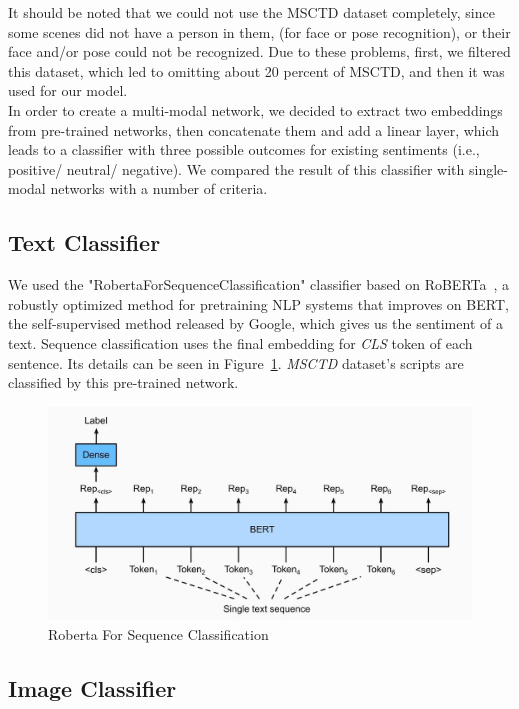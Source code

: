 It should be noted that we could not use the MSCTD dataset completely, since some scenes did not have a person in them, (for face or pose recognition), or their face and/or pose could not be recognized. Due to these problems, first, we filtered this dataset, which led to omitting about 20 percent of MSCTD, and then it was used for our model.
\\
In order to create a multi-modal network, we decided to extract two embeddings from pre-trained networks, then concatenate them and add a linear layer, which leads to a classifier with three possible outcomes for existing sentiments  (i.e., positive/ neutral/ negative). We compared the result of this classifier with single-modal networks with a number of criteria. 

\subsection{Text Classifier}
We used the "RobertaForSequenceClassification" classifier based on RoBERTa~\cite{liu2019roberta}, a robustly optimized method for pretraining NLP systems that improves on BERT, the self-supervised method released by Google, which gives us the sentiment of a text. Sequence classification uses the final embedding for \textit{CLS} token of each sentence. Its details can be seen in Figure~\ref{fig:CLS}. \textit{MSCTD} dataset's scripts are classified by this pre-trained network. 

\begin{figure}[t]
	\centering
	\includegraphics[width=\linewidth]{fig/CLS}
	\caption{Roberta For Sequence Classification}
	\label{fig:CLS}
\end{figure}

\subsection{Image Classifier}

